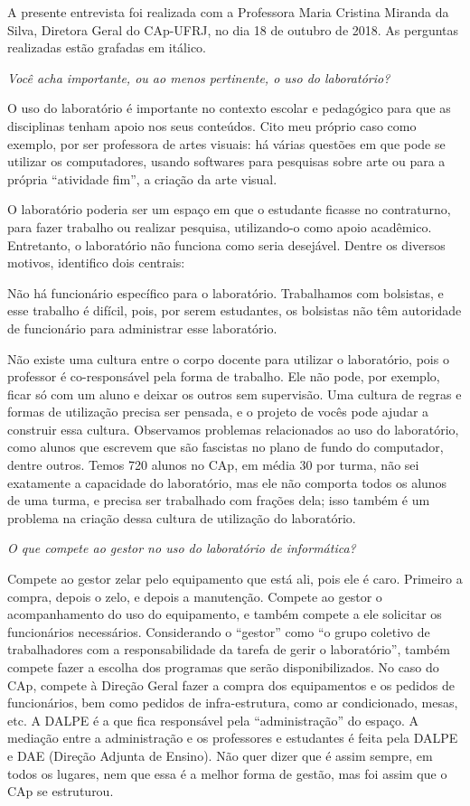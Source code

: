 \label{anx:LABEL_ANX_A}

A presente entrevista foi realizada com a Professora Maria Cristina Miranda da Silva, Diretora Geral do CAp-UFRJ, no dia 18 de outubro de 2018. As perguntas realizadas estão grafadas em itálico.

\textit{Você acha importante, ou ao menos pertinente, o uso do laboratório?}

O uso do laboratório é importante no contexto escolar e pedagógico para que as disciplinas tenham apoio nos seus conteúdos. Cito meu próprio caso como exemplo, por ser professora de artes visuais: há várias questões em que pode se utilizar os computadores, usando softwares para pesquisas sobre arte ou para a própria “atividade fim”, a criação da arte visual.

O laboratório poderia ser um espaço em que o estudante ficasse no contraturno, para fazer trabalho ou realizar pesquisa, utilizando-o como apoio acadêmico. Entretanto, o laboratório não funciona como seria desejável. Dentre os diversos motivos, identifico dois centrais:

Não há funcionário específico para o laboratório. Trabalhamos com bolsistas, e esse trabalho é difícil, pois, por serem estudantes, os bolsistas não têm autoridade de funcionário para administrar esse laboratório.

Não existe uma cultura entre o corpo docente para utilizar o laboratório, pois o professor é co-responsável pela forma de trabalho. Ele não pode, por exemplo, ficar só com um aluno e deixar os outros sem supervisão. Uma cultura de regras e formas de utilização precisa ser pensada, e o projeto de vocês pode ajudar a construir essa cultura. Observamos problemas relacionados ao uso do laboratório, como alunos que escrevem que são fascistas no plano de fundo do computador, dentre outros. Temos 720 alunos no CAp, em média 30 por turma, não sei exatamente a capacidade do laboratório, mas ele não comporta todos os alunos de uma turma, e precisa ser trabalhado com frações dela; isso também é um problema na criação dessa cultura de utilização do laboratório.

\textit{O que compete ao gestor no uso do laboratório de informática?}

Compete ao gestor zelar pelo equipamento que está ali, pois ele é caro. Primeiro a compra, depois o zelo, e depois a manutenção. Compete ao gestor o acompanhamento do uso do equipamento, e também compete a ele solicitar os funcionários necessários. Considerando o “gestor” como “o grupo coletivo de trabalhadores com a responsabilidade da tarefa de gerir o laboratório”, também compete fazer a escolha dos programas que serão disponibilizados. No caso do CAp, compete à Direção Geral fazer a compra dos equipamentos e os pedidos de funcionários, bem como pedidos de infra-estrutura, como ar condicionado, mesas, etc. A DALPE é a que fica responsável pela “administração” do espaço. A mediação entre a administração e os professores e estudantes é feita pela DALPE e DAE (Direção Adjunta de Ensino). Não quer dizer que é assim sempre, em todos os lugares, nem que essa é a melhor forma de gestão, mas foi assim que o CAp se estruturou. 

